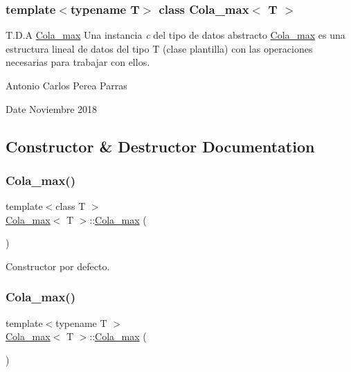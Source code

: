 \subsubsection*{template$<$typename T$>$\newline
class Cola\+\_\+max$<$ T $>$}

T.\+D.\+A \mbox{\hyperlink{class_cola__max}{Cola\+\_\+max}} Una instancia {\itshape c} del tipo de datos abstracto {\ttfamily \mbox{\hyperlink{class_cola__max}{Cola\+\_\+max}}} es una estructura lineal de datos del tipo T (clase plantilla) con las operaciones necesarias para trabajar con ellos. 

Antonio Carlos Perea Parras \begin{DoxyDate}{Date}
Noviembre 2018 
\end{DoxyDate}


\subsection{Constructor \& Destructor Documentation}
\mbox{\label{class_cola__max_af9a05d272cd9447f8ac449e8703c8ecb}} 
\subsubsection{\texorpdfstring{Cola\+\_\+max()}{Cola\_max()}\hspace{0.1cm}{\footnotesize\ttfamily [1/2]}}
{\footnotesize\ttfamily template$<$class T $>$ \\
\mbox{\hyperlink{class_cola__max}{Cola\+\_\+max}}$<$ T $>$\+::\mbox{\hyperlink{class_cola__max}{Cola\+\_\+max}} (\begin{DoxyParamCaption}{ }\end{DoxyParamCaption})}



Constructor por defecto. 

\mbox{\label{class_cola__max_af9a05d272cd9447f8ac449e8703c8ecb}} 
\subsubsection{\texorpdfstring{Cola\+\_\+max()}{Cola\_max()}\hspace{0.1cm}{\footnotesize\ttfamily [2/2]}}
{\footnotesize\ttfamily template$<$typename T $>$ \\
\mbox{\hyperlink{class_cola__max}{Cola\+\_\+max}}$<$ T $>$\+::\mbox{\hyperlink{class_cola__max}{Cola\+\_\+max}} (\begin{DoxyParamCaption}{ }\end{DoxyParamCaption})}



